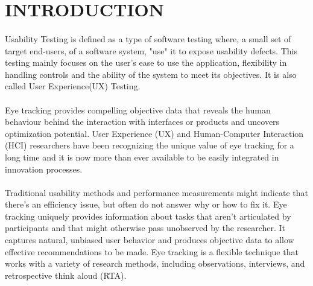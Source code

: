 \documentclass[a4paper,12pt,oneside]{article}
\begin{document}
\setlength{\baselineskip}{1.0\baselineskip}

\setlength{\baselineskip}{1.0\baselineskip}
\newpage
\begin{center}
\tableofcontents
\end{center}

\newpage
\thispagestyle{plain}
\begin{center}
\listoffigures
\end{center}

\newpage
\rfoot{\thepage}
\rfoot{\thepage}
\renewcommand{\headrulewidth}{0.0pt}
\renewcommand{\footrulewidth}{0.0pt}
\renewcommand{\headrulewidth}{0.0pt}
\renewcommand{\footrulewidth}{0.0pt}
\section{INTRODUCTION}
\paragraph{}
Usability Testing is defined as a type of software testing where, a small set of target end-users, of a software system, "use" it to expose usability defects. This testing mainly focuses on the user's ease to use the application, flexibility in handling controls and the ability of the system to meet its objectives. It is also called User Experience(UX) Testing.
\paragraph{}
Eye tracking provides compelling objective data that reveals the human behaviour behind the interaction with interfaces or products and uncovers optimization potential. User Experience (UX) and Human-Computer Interaction (HCI) researchers have been recognizing the unique value of eye tracking for a long time and it is now more than ever available to be easily integrated in innovation processes.
\paragraph{}
Traditional usability methods and performance measurements might indicate that there's an efficiency issue, but often do not answer why or how to fix it. Eye tracking uniquely provides information about tasks that aren't articulated by participants and that might otherwise pass unobserved by the researcher. It captures natural, unbiased user behavior and produces objective data to allow effective recommendations to be made.
Eye tracking is a flexible technique that works with a variety of research methods, including observations, interviews, and retrospective think aloud (RTA).
\end{document}
